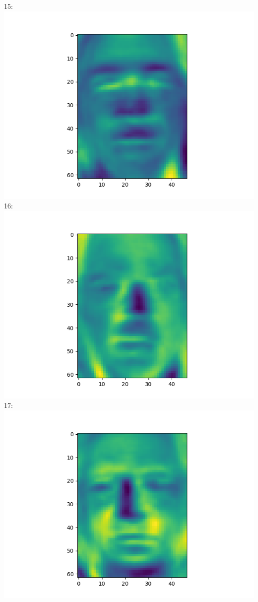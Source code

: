 \documentclass[twoside,10pt]{article}
\theoremstyle{definition}
\theoremstyle{definition}
\theoremstyle{remark}
\renewcommand{\>}{{\rightarrow}}
\newcommand{\1}{{\mathbf 1}}
\newcommand{\0}{{\mathbf 0}}
\begin{document}
\begin{enumerate}
  15:
  \includegraphics[width=\textwidth]{eigenface_15.png}
  16:
  \includegraphics[width=\textwidth]{eigenface_16.png}
  17:
  \includegraphics[width=\textwidth]{eigenface_17.png}

\end{enumerate}
\end{document}
